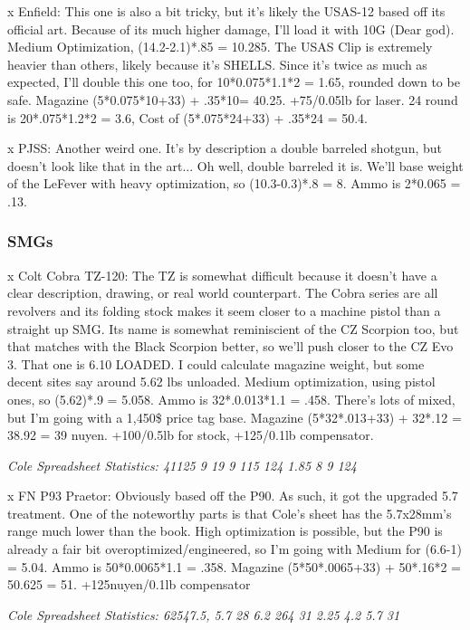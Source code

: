 \begin{multicols*}{2}
	x Enfield: This one is also a bit tricky, but it's likely the USAS-12 based off its official art. Because of its much higher damage, I'll load it with 10G (Dear god). Medium Optimization, (14.2-2.1)*.85 = 10.285. The USAS Clip is extremely heavier than others, likely because it's SHELLS. Since it's twice as much as expected, I'll double this one too, for 10*0.075*1.1*2 = 1.65, rounded down to be safe. Magazine (5*0.075*10+33) + .35*10= 40.25. +75/0.05lb for laser. 24 round is 20*.075*1.2*2 = 3.6, Cost of (5*.075*24+33) + .35*24 = 50.4.
	
	x PJSS: Another weird one. It's by description a double barreled shotgun, but doesn't look like that in the art... Oh well, double barreled it is. We'll base weight of the LeFever with heavy optimization, so (10.3-0.3)*.8 = 8. Ammo is  2*0.065 = .13.
	
	\subsubsection{SMGs}
	
	x Colt Cobra TZ-120: The TZ is somewhat difficult because it doesn't have a clear description, drawing, or real world counterpart. The Cobra series are all revolvers and its folding stock makes it seem closer to a machine pistol than a straight up SMG. Its name is somewhat reminiscient of the CZ Scorpion too, but that matches with the Black Scorpion better, so we'll push closer to the CZ Evo 3. That one is 6.10 LOADED. I could calculate \GURPS magazine weight, but some decent sites say around 5.62 lbs unloaded. Medium optimization, using pistol ones, so (5.62)*.9 = 5.058. Ammo is 32*.0.013*1.1 = .458. There's lots of mixed, but I'm going with a 1,450\$ price tag base. Magazine (5*32*.013+33) + 32*.12 = 38.92 = 39 nuyen. +100/0.5lb for stock, +125/0.1lb compensator.
	
	\textit{\textcolor{OliveGreen}{Cole Spreadsheet Statistics: 41125 9 19 9 115 124 1.85 8 9 124 }}
	
	x FN P93 Praetor: Obviously based off the P90. As such, it got the upgraded 5.7 treatment. One of the noteworthy parts is that Cole's sheet has the 5.7x28mm's range much lower than the book. High optimization is possible, but the P90 is already a fair bit overoptimized/engineered, so I'm going with Medium for (6.6-1) = 5.04. Ammo is 50*0.0065*1.1 = .358. Magazine (5*50*.0065+33) + 50*.16*2 = 50.625 = 51. +125nuyen/0.1lb compensator
	
	\textit{\textcolor{OliveGreen}{Cole Spreadsheet Statistics:  62547.5, 5.7 28 6.2 264 31 2.25 4.2 5.7 31}}
	

\end{multicols*}
